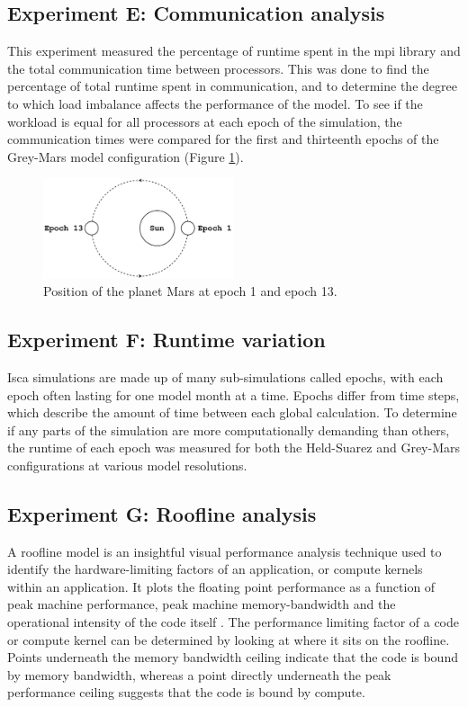 \documentclass[a4paper,11pt]{report}
\begin{document}
\subsection{Experiment E: Communication analysis}
This experiment measured the percentage of runtime spent in the \gls{mpi} library and the total communication time between processors. This was done to find the percentage of total runtime spent in communication, and to determine the degree to which load imbalance affects the performance of the model. To see if the workload is equal for all processors at each epoch of the simulation, the communication times were compared for the first and thirteenth epochs of the Grey-Mars model configuration (Figure \ref{fig:orbits}). 

\begin{figure}[htbp]
\begin{center}
\includegraphics[width=0.5\textwidth]{img/orbit.pdf}
\caption{Position of the planet Mars at epoch 1 and epoch 13.}
\label{fig:orbits}
\end{center}
\end{figure}

\subsection{Experiment F: Runtime variation}
Isca simulations are made up of many sub-simulations called epochs, with each epoch often lasting for one model month at a time. Epochs differ from time steps, which describe the amount of time between each global calculation. To determine if any parts of the simulation are more computationally demanding than others, the runtime of each epoch was measured for both the Held-Suarez and Grey-Mars configurations at various model resolutions. 

\subsection{Experiment G: Roofline analysis}
A roofline model is an insightful visual performance analysis technique used to identify the hardware-limiting factors of an application, or compute kernels within an application. It plots the floating point performance as a function of peak machine performance, peak machine memory-bandwidth and the operational intensity of the code itself \cite{williams2009roofline}. The performance limiting factor of a code or compute kernel can be determined by looking at where it sits on the roofline. Points underneath the memory bandwidth ceiling indicate that the code is bound by memory bandwidth, whereas a point directly underneath the peak performance ceiling suggests that the code is bound by compute.
\end{document}
